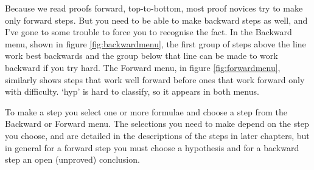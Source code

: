 \documentclass[11pt]{book}
\newcommand{\figref}[1]{figure \ref{fig:#1}}
\begin{document}
Because we read proofs forward, top-to-bottom, most proof novices try to make only forward steps. But you need to be able to make backward steps as well, and I've gone to some trouble to force you to recognise the fact. In the Backward menu, shown in \figref{backwardmenu}, the first group of steps above the line work best backwards and the group below that line can be made to work backward if you try hard. The Forward menu, in \figref{forwardmenu}, similarly shows steps that work well forward before ones that work forward only with difficulty. `hyp' is hard to classify, so it appears in both menus.

To make a step you select one or more formulae and choose a step from the Backward or Forward menu. The selections you need to make depend on the step you choose, and are detailed in the descriptions of the steps in later chapters, but in general for a forward step you must choose a hypothesis and for a backward step an open (unproved) conclusion.
\end{document}
